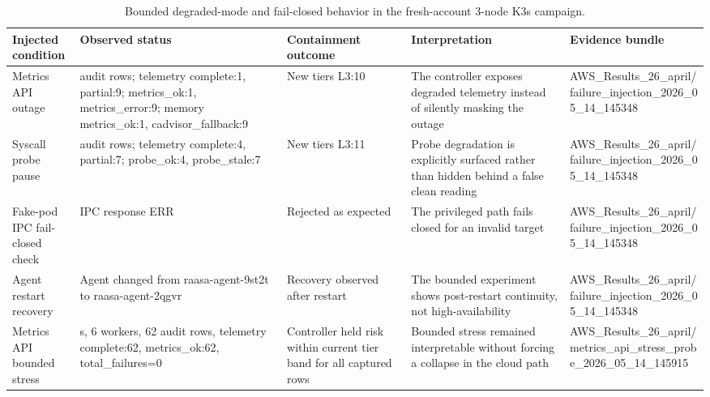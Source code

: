 \begin{table}[t]
\centering
\scriptsize
\setlength{\tabcolsep}{3.2pt}
\renewcommand{\arraystretch}{1.10}
\caption{Bounded degraded-mode and fail-closed behavior in the fresh-account 3-node K3s campaign.}
\label{tab:failure-degraded-mode-summary}
\begin{tabularx}{\textwidth}{p{} >{\raggedright\arraybackslash}X p{} >{\raggedright\arraybackslash}X p{}}
\toprule
Injected condition & Observed status & Containment outcome & Interpretation & Evidence bundle \\
\midrule
Metrics API outage & 10 audit rows; telemetry complete:1, partial:9; metrics\_ok:1, metrics\_error:9; memory metrics\_ok:1, cadvisor\_fallback:9 & New tiers L3:10 & The controller exposes degraded telemetry instead of silently masking the outage & AWS\_Results\_26\_april/failure\_injection\_2026\_05\_14\_145348 \\
Syscall probe pause & 11 audit rows; telemetry complete:4, partial:7; probe\_ok:4, probe\_stale:7 & New tiers L3:11 & Probe degradation is explicitly surfaced rather than hidden behind a false clean reading & AWS\_Results\_26\_april/failure\_injection\_2026\_05\_14\_145348 \\
Fake-pod IPC fail-closed check & IPC response ERR & Rejected as expected & The privileged path fails closed for an invalid target & AWS\_Results\_26\_april/failure\_injection\_2026\_05\_14\_145348 \\
Agent restart recovery & Agent changed from raasa-agent-9st2t to raasa-agent-2qgvr & Recovery observed after restart & The bounded experiment shows post-restart continuity, not high-availability & AWS\_Results\_26\_april/failure\_injection\_2026\_05\_14\_145348 \\
Metrics API bounded stress & 30 s, 6 workers, 62 audit rows, telemetry complete:62, metrics\_ok:62, total\_failures=0 & Controller held risk within current tier band for all captured rows & Bounded stress remained interpretable without forcing a collapse in the cloud path & AWS\_Results\_26\_april/metrics\_api\_stress\_probe\_2026\_05\_14\_145915 \\
\bottomrule
\end{tabularx}
\end{table}

